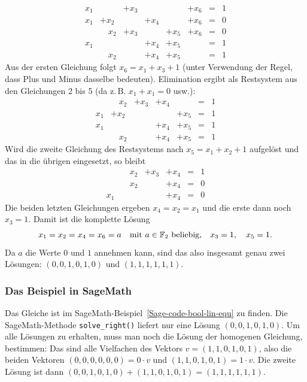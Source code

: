 \begin{refsegment}
\[
   \begin{matrix}
     x_1 &           & + x_3 &       &       & + x_6 & = & 1 \\
     x_1 & + x_2     &       & + x_4 &       & + x_6 & = & 0 \\
         & \quad x_2 & + x_3 &       & + x_5 & + x_6 & = & 0 \\
     x_1 &           &       & + x_4 & + x_5 &       & = & 1 \\
         & \quad x_2 &       & + x_4 & + x_5 &       & = & 1
   \end{matrix}
\]
Aus der ersten Gleichung folgt $x_6 = x_1 + x_3 + 1$ (unter Verwendung der Regel, dass
Plus und Minus dasselbe bedeuten). Elimination ergibt als
Restsystem aus den Gleichungen 2 bis 5 (da z.\,B. $x_1 + x_1 = 0$ usw.):
\[
   \begin{matrix}
         & \quad x_2 & + x_3 & + x_4 &       & = & 1 \\
     x_1 &     + x_2 &       &       & + x_5 & = & 1 \\
     x_1 &           &       & + x_4 & + x_5 & = & 1 \\
         & \quad x_2 &       & + x_4 & + x_5 & = & 1
   \end{matrix}
\]
Wird die zweite Gleichung des Restsystems nach $x_5 = x_1 + x_2 + 1$
aufgelöst und das in die übrigen eingesetzt, so bleibt
\[
   \begin{matrix}
         & \quad x_2 & + x_3 & + x_4 & = & 1 \\
         & \quad x_2 &       & + x_4 & = & 0 \\
     x_1 &           &       & + x_4 & = & 0
   \end{matrix}
\]
Die beiden letzten Gleichungen ergeben $x_4 = x_2 = x_1$ und die erste dann
noch $x_3 = 1$. Damit ist die komplette Lösung
\[
     x_1 = x_2 = x_4 = x_6 = a \quad\text{mit } a \in \mathbb{F}_2 \text{ beliebig,}
     \quad x_3 = 1, \quad x_5 = 1.
\]
Da $a$ die Werte $0$ und $1$ annehmen kann, sind das also insgesamt
genau zwei Lösungen: $(0,0,1,0,1,0)$ und $(1,1,1,1,1,1)$.

\subsubsection*{Das Beispiel in SageMath}

Das Gleiche ist im SageMath-Beispiel~\ref{Sage-code-bool-lin-equ}
zu finden. Die SageMath-Methode {\tt solve\_right()} liefert nur eine
Lösung $(0,0,1,0,1,0)$. Um alle Lösungen zu erhalten, muss man noch
die Lösung der homogenen Gleichung, bestimmen: Das sind alle Vielfachen
des Vektors $v = (1,1,0,1,0,1)$, also die beiden Vektoren $(0,0,0,0,0,0) = 0 \cdot v$
und $(1,1,0,1,0,1) = 1 \cdot v$. Die zweite Lösung ist dann
$(0,0,1,0,1,0) + (1,1,0,1,0,1) = (1,1,1,1,1,1)$.


\end{refsegment}

